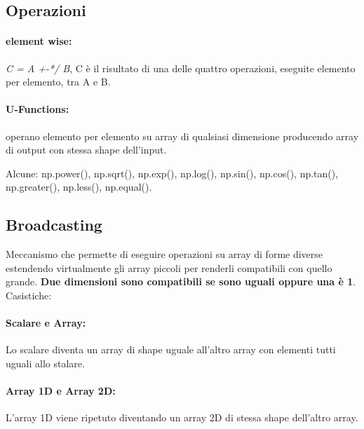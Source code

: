 \subsection{Operazioni}
\paragraph{element wise:} \textit{C = A +-*/ B}, C è il risultato di una delle quattro operazioni, eseguite elemento per elemento, tra A e B.
\paragraph{U-Functions:} operano elemento per elemento su array di qualsiasi dimensione producendo array di output con stessa shape dell'input.

Alcune: np.power(), np.sqrt(), np.exp(), np.log(), np.sin(), np.cos(), np.tan(), np.greater(), np.less(), np.equal().

\subsection{Broadcasting}
Meccanismo che permette di eseguire operazioni su array di forme diverse estendendo virtualmente gli array piccoli per renderli compatibili con quello grande. \textbf{Due dimensioni sono compatibili se sono uguali oppure una è 1}. Casistiche:
\paragraph{Scalare e Array:} Lo scalare diventa un array di shape uguale all'altro array con elementi tutti uguali allo stalare.
\paragraph{Array 1D e Array 2D:} L'array 1D viene ripetuto diventando un array 2D di stessa shape dell'altro array.
